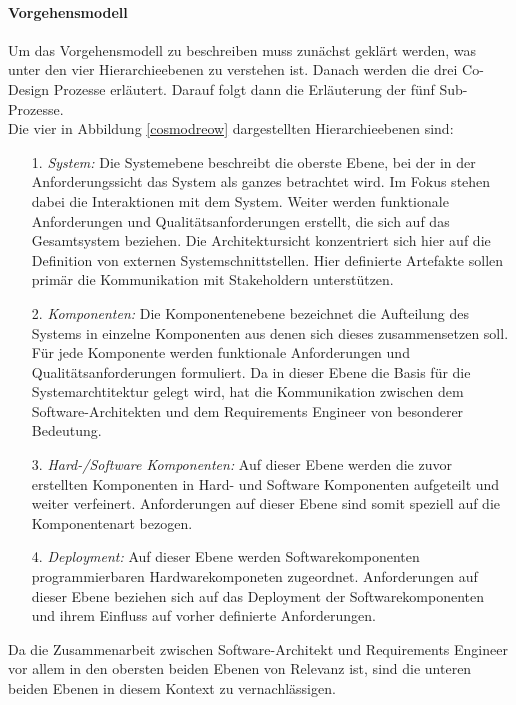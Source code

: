 \paragraph{Vorgehensmodell}
Um das Vorgehensmodell zu beschreiben muss zun\"achst gekl\"art werden, was unter den vier Hierarchieebenen zu verstehen ist. Danach werden die drei Co-Design Prozesse erl\"autert. Darauf folgt dann die Erl\"auterung der f\"unf Sub-Prozesse.\\

Die vier in Abbildung \ref{cosmodreow} dargestellten Hierarchieebenen sind:\\

\begin{itemize}
\item[1.] \emph{System:} Die Systemebene beschreibt die oberste Ebene, bei der in der Anforderungssicht das System als ganzes betrachtet wird. Im Fokus stehen dabei die Interaktionen mit dem System. Weiter werden funktionale Anforderungen und Qualit\"atsanforderungen erstellt, die sich auf das Gesamtsystem beziehen. Die Architektursicht konzentriert sich hier auf die Definition von externen Systemschnittstellen. Hier definierte Artefakte sollen prim\"ar die Kommunikation mit Stakeholdern unterst\"utzen.
\item[2.] \emph{Komponenten:} Die Komponentenebene bezeichnet die Aufteilung des Systems in einzelne Komponenten aus denen sich dieses zusammensetzen soll. F\"ur jede Komponente werden funktionale Anforderungen und Qualit\"atsanforderungen formuliert. Da in dieser Ebene die Basis f\"ur die Systemarchtitektur gelegt wird, hat die Kommunikation zwischen dem Software-Architekten und dem Requirements Engineer von besonderer Bedeutung. 
\item[3.] \emph{Hard-/Software Komponenten:} Auf dieser Ebene werden die zuvor erstellten Komponenten in Hard- und Software Komponenten aufgeteilt und weiter verfeinert. Anforderungen auf dieser Ebene sind somit speziell auf die Komponentenart bezogen. 
\item[4.] \emph{Deployment:} Auf dieser Ebene werden Softwarekomponenten programmierbaren Hardwarekomponeten zugeordnet. Anforderungen auf dieser Ebene beziehen sich auf das Deployment der Softwarekomponenten und ihrem Einfluss auf vorher definierte Anforderungen. 
\end{itemize}
Da die Zusammenarbeit zwischen Software-Architekt und Requirements Engineer vor allem in den obersten beiden Ebenen von Relevanz ist, sind die unteren beiden Ebenen in diesem Kontext zu vernachl\"assigen.\\

